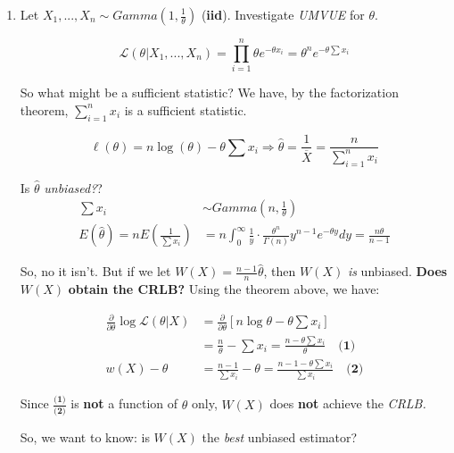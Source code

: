 \documentclass{article}
\begin{document}
\begin{enumerate}
    \item Let $X_1,...,X_n\sim Gamma\left(1,\frac{1}{\theta}\right)$ (\textbf{iid}). Investigate \textit{UMVUE} for $\theta$.
    
    \begin{equation*}
        \mathcal{L}(\theta|X_1,...,X_n) = \prod_{i=1}^n \theta e^{-\theta x_i} = \theta^n e^{-\theta \sum x_i}
    \end{equation*}
    
    So what might be a sufficient statistic? We have, by the factorization theorem, $\sum_{i=1}^n x_i$ is a sufficient statistic.
    
    \begin{equation*}
        \ell (\theta) = n\log(\theta)-\theta \sum x_i \Rightarrow \hat{\theta} = \frac{1}{\overline{X}} = \frac{n}{\sum_{i=1}^n x_i}
    \end{equation*}
    
    Is $\hat{\theta}$ \textit{unbiased?}?
    \begin{equation*}
        \begin{split}
            \sum x_i &\sim Gamma\left( n, \frac{1}{\theta}\right)\\
            E(\hat{\theta}) = n E \left(\frac{1}{\sum x_i} \right) &= n \int_{0}^\infty \frac{1}{y}\cdot \frac{\theta^n}{\Gamma(n)} y^{n-1} e^{-\theta y} dy = \frac{n\theta}{n-1}
        \end{split}
    \end{equation*}
    
    So, no it isn't. But if we let $W(X) = \frac{n-1}{n}\hat{\theta}$, then $W(X)$ \textit{is} unbiased. \textbf{Does} $W(X)$ \textbf{obtain the CRLB?} Using the theorem above, we have:
    
    \begin{equation*}
        \begin{split}
            \frac{\partial}{\partial \theta}\log \mathcal{L}(\theta|X) &= \frac{\partial}{\partial \theta} \left[ n \log \theta - \theta \sum x_i \right]\\
            &= \frac{n}{\theta} - \sum x_i = \frac{n-\theta \sum x_i}{\theta} \quad \textbf{(1)}\\
            w(X) - \theta &= \frac{n-1}{\sum x_i} - \theta = \frac{n-1-\theta \sum x_i}{\sum x_i} \quad \textbf{(2)}
        \end{split}
    \end{equation*}
    
    Since $\frac{\textbf{(1)}}{\textbf{(2)}}$ is \textbf{not} a function of $\theta$ only, $W(X)$ does \textbf{not} achieve the \textit{CRLB.}
    
    So, we want to know: is $W(X)$ the \textit{best} unbiased estimator?
\end{enumerate}
\end{document}
